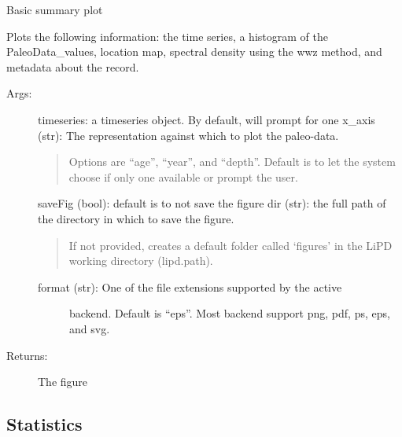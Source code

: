 \documentclass[letterpaper,10pt,english]{sphinxmanual}
\begin{document}
\begin{fulllineitems}
\label{\detokenize{Main:pyleoclim.summaryTs}}
Basic summary plot

Plots the following information: the time series, a histogram of
the PaleoData\_values, location map, spectral density using the wwz
method, and metadata about the record.
\begin{description}
\item[{Args:}] \leavevmode
timeseries: a timeseries object. By default, will prompt for one
x\_axis (str): The representation against which to plot the paleo-data.
\begin{quote}

Options are “age”, “year”, and “depth”. Default is to let the
system choose if only one available or prompt the user.
\end{quote}

saveFig (bool): default is to not save the figure
dir (str): the full path of the directory in which to save the figure.
\begin{quote}

If not provided, creates a default folder called ‘figures’ in the
LiPD working directory (lipd.path).
\end{quote}
\begin{description}
\item[{format (str): One of the file extensions supported by the active}] \leavevmode
backend. Default is “eps”. Most backend support png, pdf, ps, eps,
and svg.

\end{description}

\item[{Returns:}] \leavevmode
The figure

\end{description}

\end{fulllineitems}



\subsection{Statistics}
\label{\detokenize{Main:statistics}}
\end{document}
